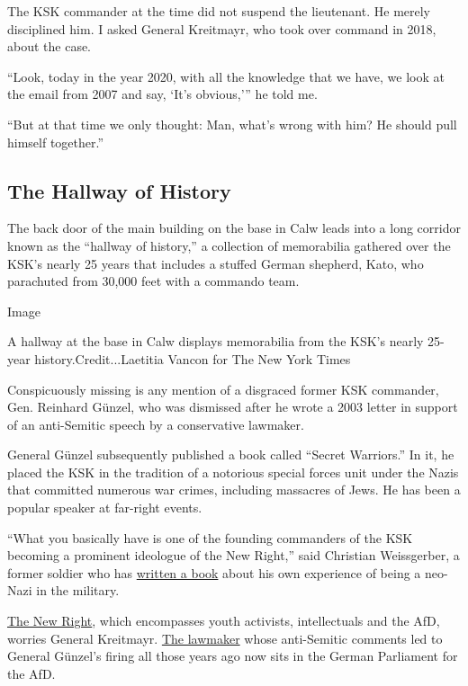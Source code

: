 The KSK commander at the time did not suspend the lieutenant. He merely
disciplined him. I asked General Kreitmayr, who took over command in
2018, about the case.

``Look, today in the year 2020, with all the knowledge that we have, we
look at the email from 2007 and say, `It's obvious,''' he told me.

``But at that time we only thought: Man, what's wrong with him? He
should pull himself together.''

\hypertarget{the-hallway-of-history}{%
\subsection{The Hallway of History}\label{the-hallway-of-history}}

The back door of the main building on the base in Calw leads into a long
corridor known as the ``hallway of history,'' a collection of
memorabilia gathered over the KSK's nearly 25 years that includes a
stuffed German shepherd, Kato, who parachuted from 30,000 feet with a
commando team.

Image

A hallway at the base in Calw displays memorabilia from the KSK's nearly
25-year history.Credit...Laetitia Vancon for The New York Times

Conspicuously missing is any mention of a disgraced former KSK
commander, Gen. Reinhard Günzel, who was dismissed after he wrote a 2003
letter in support of an anti-Semitic speech by a conservative lawmaker.

General Günzel subsequently published a book called ``Secret Warriors.''
In it, he placed the KSK in the tradition of a notorious special forces
unit under the Nazis that committed numerous war crimes, including
massacres of Jews. He has been a popular speaker at far-right events.

``What you basically have is one of the founding commanders of the KSK
becoming a prominent ideologue of the New Right,'' said Christian
Weissgerber, a former soldier who has
\href{https://www.ofv.ch/sachbuch/detail/mein-vaterland-warum-ich-ein-neonazi-war/103760/}{written
a book} about his own experience of being a neo-Nazi in the military.

\href{https://www.nytimes.com/2018/12/27/world/europe/germany-far-right-generation-identity.html}{The
New Right}, which encompasses youth activists, intellectuals and the
AfD, worries General Kreitmayr. \href{https://www.martinhohmann.de/}{The
lawmaker} whose anti-Semitic comments led to General Günzel's firing all
those years ago now sits in the German Parliament for the AfD.

